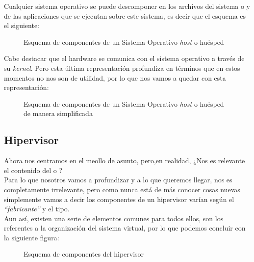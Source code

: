 Cualquier sistema operativo se puede descomponer en los archivos del sistema o \emph{} y de las aplicaciones que se ejecutan sobre este sistema, es decir que el esquema es el siguiente:

\begin{figure}[H]
\begin{center}
\end{center}
\caption[Sistema Operativo huésped]{Esquema de componentes de un Sistema Operativo \emph{host} o huésped}
\end{figure}

Cabe destacar que el hardware se comunica con el sistema operativo a través de su \emph{kernel}. Pero esta última representación profundiza en términos que en estos momentos no nos son de utilidad, por lo que nos vamos a quedar con esta representación:

\begin{figure}[H]
\begin{center}
\end{center}
\caption[Sistema Operativo huésped simplificado]{Esquema de componentes de un Sistema Operativo \emph{host} o huésped de manera simplificada}
\end{figure}

\subsection{Hipervisor}
Ahora nos centramos en el meollo de asunto, pero,en realidad, ¿Nos es relevante el contenido del  o ?\\

Para lo que nosotros vamos a profundizar y a lo que queremos llegar, nos es completamente irrelevante, pero como nunca está de más conocer cosas nuevas simplemente vamos a decir los componentes de un hipervisor varían según el \emph{\textquotedblleft fabricante\textquotedblright} y el tipo.\\

Aun así, existen una serie de elementos comunes para todos ellos, son los referentes a la organización del sistema virtual, por lo que podemos concluir con la siguiente figura:

\begin{figure}[H]
\begin{center}
\end{center}
\caption[Componentes hipervisor]{Esquema de componentes del hipervisor}
\end{figure}

